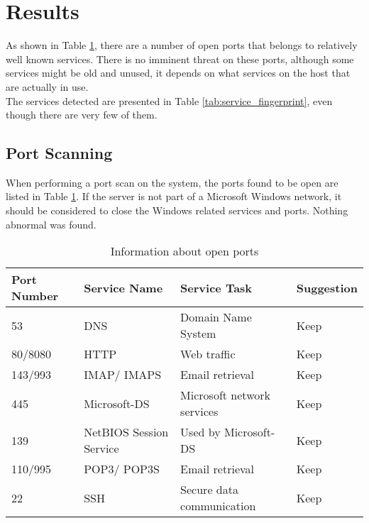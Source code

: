 \section{Results}

As shown in Table \ref{tab:open_ports}, there are a number of open ports that belongs to relatively well known services. There is no imminent threat on these ports, although some services might be old and unused, it depends on what services on the host that are actually in use. \\

\noindent The services detected are presented in Table \ref{tab:service_fingerprint}, even though there are very few of them.


\subsection{Port Scanning}

When performing a port scan on the system, the ports found to be open are listed in Table \ref{tab:open_ports}. If the server is not part of a Microsoft Windows network, it should be considered to close the Windows related services and ports. Nothing abnormal was found. 

\begin{table}[htb]
 \centering
 \caption{Information about open ports} \label{tab:open_ports}
 \begin{tabular}{m{3cm}m{3cm}p{5cm}p{2cm}} \toprule
     \textbf{Port Number} & \textbf{Service Name} & 
     \textbf{Service Task} &  \textbf{Suggestion} \\ \midrule
        53      &   DNS         &   Domain Name System  &   Keep    \\
        80/8080 &   HTTP        &   Web traffic         &   Keep    \\
        143/993 &   IMAP/ \newline IMAPS  &   Email retrieval     &   Keep    \\
        445     &   Microsoft-DS & Microsoft network services \footnotemark[1] &   Keep\footnotemark[2]  \\ 
        139     &   NetBIOS Session Service &  Used by Microsoft-DS & Keep\footnotemark[2] \\
        110/995 &   POP3/ \newline POP3S  &   Email retrieval     &   Keep \\
        22      &   SSH  &   Secure data communication &   Keep \\
\bottomrule
 \end{tabular} 
\end{table}

